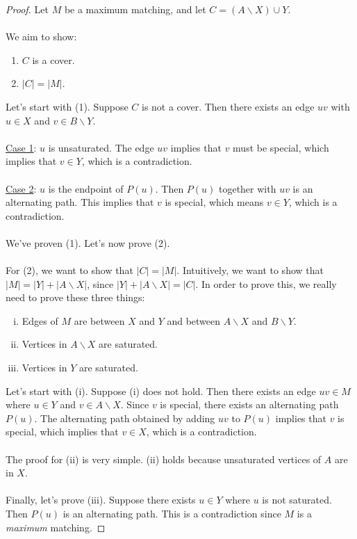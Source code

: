 \documentclass[]{article}
\theoremstyle{definition}
\begin{document}
			\begin{proof}
				Let $M$ be a maximum matching, and let $C = (A \backslash X) \cup Y$.
				\\ \\
				We aim to show:
				\begin{enumerate}
					\item $C$ is a cover.
					\item $|C| = |M|$.
				\end{enumerate}

				Let's start with (1). Suppose $C$ is not a cover. Then there exists an edge $uv$ with $u \in X$ and $v \in B \backslash Y$.
				\\ \\
				\underline{Case 1}: $u$ is unsaturated. The edge $uv$ implies that $v$ must be special, which implies that $v \in Y$, which is a contradiction.
				\\ \\
				\underline{Case 2}: $u$ is the endpoint of $P(u)$. Then $P(u)$ together with $uv$ is an alternating path. This implies that $v$ is special, which means $v \in Y$, which is a contradiction.
				\\ \\
				We've proven (1). Let's now prove (2).
				\\ \\
				For (2), we want to show that $|C| = |M|$. Intuitively, we want to show that $|M| = |Y| + |A \backslash X|$, since $|Y| + |A \backslash X| = |C|$. In order to prove this, we really need to prove these three things:
				\begin{enumerate}[(i)]
					\item Edges of $M$ are between $X$ and $Y$ and between $A \backslash X$ and $B \backslash Y$.
					\item Vertices in $A \backslash X$ are saturated.
					\item Vertices in $Y$ are saturated.
				\end{enumerate}

				Let's start with (i). Suppose (i) does not hold. Then there exists an edge $uv \in M$ where $u \in Y$ and $v \in A \backslash X$. Since $v$ is special, there exists an alternating path $P(u)$. The alternating path obtained by adding $uv$ to $P(u)$ implies that $v$ is special, which implies that $v \in X$, which is a contradiction.
				\\ \\
				The proof for (ii) is very simple. (ii) holds because unsaturated vertices of $A$ are in $X$.
				\\ \\
				Finally, let's prove (iii). Suppose there exists $u \in Y$ where $u$ is not saturated. Then $P(u)$ is an alternating path. This is a contradiction since $M$ is a \emph{maximum} matching.
			\end{proof}
\end{document}

